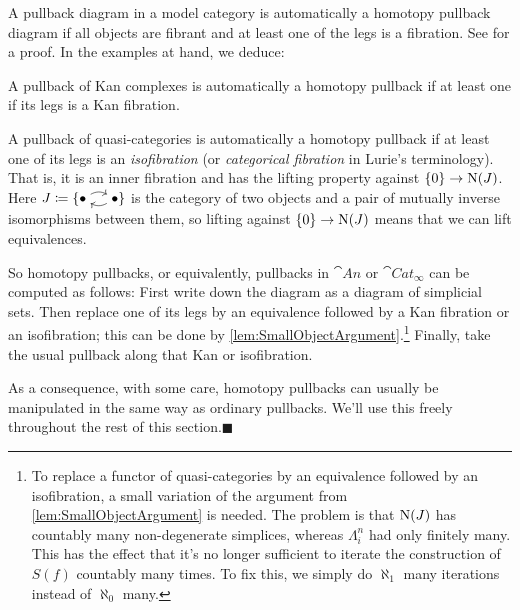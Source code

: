 \begin{numpar}\label{par:HomotopyPullback}
	A pullback diagram in a model category is automatically a homotopy pullback diagram if all objects are fibrant and at least one of the legs is a fibration. See \cite[Proposition~{\href{https://cisinski.app.uni-regensburg.de/CatLR.pdf\#thm.2.3.27}{2.3.27}}]{Cisinski} for a proof. In the examples at hand, we deduce:
	\begin{alphanumerate}
		\item A pullback of Kan complexes is automatically a homotopy pullback if at least one if its legs is a Kan fibration.\label{enum:HomotopyPullbackOfKanComplexes}
		\item A pullback of quasi-categories is automatically a homotopy pullback if at least one of its legs is an \emph{isofibration} (or \emph{categorical fibration} in Lurie's terminology). That is, it is an inner fibration and has the lifting property against $\{0\}\rightarrow \operatorname{N}(J)$. Here $J\coloneqq \{\InlineJ\}$ is the category of two objects and a pair of mutually inverse isomorphisms between them, so lifting against $\{0\}\rightarrow \operatorname{N}(J)$ means that we can lift equivalences.\label{enum:HomotopyPullbackOfQuasicategories}
	\end{alphanumerate}
	So homotopy pullbacks, or equivalently, pullbacks in $\cat{An}$ or $\cat{Cat}_\infty$ can be computed as follows: First write down the diagram as a diagram of simplicial sets. Then replace one of its legs by an equivalence followed by a Kan fibration or an isofibration; this can be done by \cref{lem:SmallObjectArgument}.\footnote{To replace a functor of quasi-categories by an equivalence followed by an isofibration, a small variation of the argument from \cref{lem:SmallObjectArgument} is needed. The problem is that $\operatorname{N}(J)$ has countably many non-degenerate simplices, whereas $\Lambda_i^n$ had only finitely many. This has the effect that it's no longer sufficient to iterate the construction of $S(f)$ countably many times. To fix this, we simply do $\aleph_1$ many iterations instead of $\aleph_0$ many.} Finally, take the usual pullback along that Kan or isofibration.
	
	As a consequence, with some care, homotopy pullbacks can usually be manipulated in the same way as ordinary pullbacks. We'll use this freely throughout the rest of this section.\hfill$\blacksquare$
\end{numpar}
